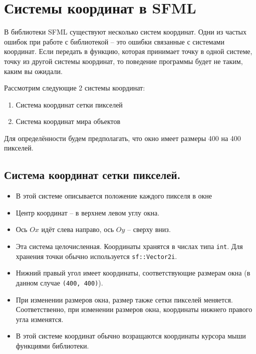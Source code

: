 \documentclass{article}
\begin{document}
\section{Системы координат в SFML}
В библиотеки SFML существуют несколько систем координат. Одни из частых ошибок при работе с библиотекой -- это ошибки связанные с системами координат. Если передать в функцию, которая принимает точку в одной системе, точку из другой системы координат, то поведение программы будет не таким, каким вы ожидали.

Рассмотрим следующие 2 системы координат:
\begin{enumerate}
\item Система координат сетки пикселей
\item Система координат мира объектов
\end{enumerate}
Для определённости будем предполагать, что окно имеет размеры 400 на 400 пикселей.

\subsection*{Система координат сетки пикселей.}
\begin{itemize}
\item В этой системе описывается положение каждого пикселя в окне
\item Центр координат -- в верхнем левом углу окна. 
\item Ось $Ox$ идёт слева направо, ось $Oy$ -- сверху вниз.
\item Эта система целочисленная. Координаты хранятся в числах типа \texttt{int}. Для хранения точки обычно используется \texttt{sf::Vector2i}.
\item Нижний правый угол имеет координаты, соответствующие размерам окна (в данном случае \texttt{(400, 400)}).
\item При изменении размеров окна, размер также сетки пикселей меняется. Соответственно, при изменении размеров окна, координаты нижнего правого угла изменятся.
\item В этой системе координат обычно возращаются координаты курсора мыши функциями библиотеки.
\end{itemize}
\end{document}
